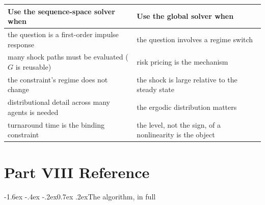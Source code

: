 \documentclass[10pt,a4paper]{article}
\makeatletter
\theoremstyle{definition}
\theoremstyle{plain}
\theoremstyle{remark}
\renewcommand\section{\@startsection{section}{1}{\z@}%
  {-1.6ex \@plus -.4ex \@minus -.2ex}{0.7ex \@plus.2ex}{\normalfont\large\bfseries}}
\makeatother
\begin{document}
\begin{center}\small
\begin{tabular}{@{}p{}p{}@{}}
\toprule
\textbf{Use the sequence-space solver when} & \textbf{Use the global solver when} \\
\midrule
the question is a first-order impulse response & the question involves a regime switch \\
many shock paths must be evaluated ($G$ is reusable) & risk pricing is the mechanism \\
the constraint's regime does not change & the shock is large relative to the steady state \\
distributional detail across many agents is needed & the ergodic distribution matters \\
turnaround time is the binding constraint & the level, not the sign, of a nonlinearity is the
object \\
\bottomrule
\end{tabular}
\end{center}

\vspace{-4pt}\part*{Part VIII \quad Reference}\small
{}
\section{The algorithm, in full}
\end{document}
